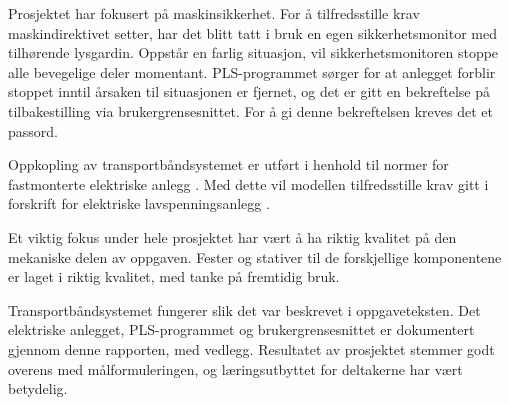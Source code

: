 \documentclass[Visionprosjekt.tex]{subfiles}
\begin{document}

Prosjektet har fokusert på  maskinsikkerhet. For å tilfredsstille  krav  maskindirektivet setter, har det blitt  tatt i bruk en egen sikkerhetsmonitor med tilhørende lysgardin. Oppstår en farlig situasjon, vil sikkerhetsmonitoren stoppe  alle bevegelige deler momentant. PLS-programmet sørger for at anlegget forblir stoppet inntil årsaken til situasjonen er fjernet, og det er gitt en bekreftelse på tilbakestilling via brukergrensesnittet. For å gi denne bekreftelsen kreves det et passord. %



Oppkopling av transportbåndsystemet er utført i henhold til normer for fastmonterte elektriske anlegg \cite{NEK400}.  Med dette vil modellen tilfredsstille krav gitt i forskrift for elektriske lavspenningsanlegg \cite{FEL}. 










Et viktig fokus under hele prosjektet har vært å ha riktig kvalitet på den mekaniske delen av oppgaven.  Fester og stativer til de forskjellige komponentene er laget i riktig kvalitet, med tanke på fremtidig bruk. 




Transportbåndsystemet fungerer slik det var beskrevet i oppgaveteksten. 
Det elektriske anlegget, PLS-programmet og brukergrensesnittet er dokumentert gjennom denne rapporten, med vedlegg. 
Resultatet av prosjektet stemmer godt overens med målformuleringen, og læringsutbyttet for deltakerne har vært betydelig.
\end{document}
